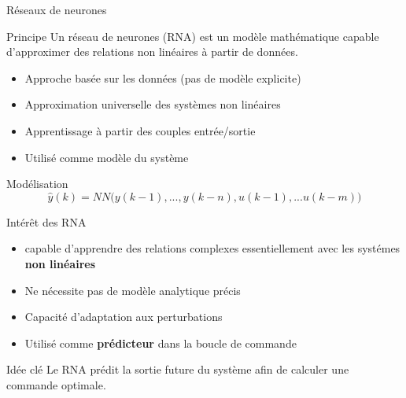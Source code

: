 \documentclass[aspectratio=169,12pt]{beamer}
\begin{document}
	\begin{frame}{\color {red}Réseaux de neurones}
		
		\begin{alertblock}{Principe}
			Un réseau de neurones (RNA) est un modèle mathématique capable 
			d’approximer des relations non linéaires à partir de données.
		\end{alertblock}
		
		\vspace{4pt}
		
		\begin{itemize}
			\item Approche basée sur les données (pas de modèle explicite)
			\item Approximation universelle des systèmes non linéaires
			\item Apprentissage à partir des couples entrée/sortie
			\item Utilisé comme modèle du système
		\end{itemize}
		
		\vspace{6pt}
		
		\begin{block}{Modélisation}
			\[
			\hat y(k) = NN\big(y(k-1),...,y(k-n),u(k-1),...u(k-m)\big)
			\]
		\end{block}
		
	\end{frame}
	\begin{frame}{\color {red}Intérêt des RNA}
		
		\begin{itemize}
			
			\item capable d'apprendre des relations complexes essentiellement avec les systémes \textbf{non linéaires}
			
			\item Ne nécessite pas de modèle analytique précis
			
			\item Capacité d’adaptation aux perturbations
			
			\item Utilisé comme \textbf{prédicteur} dans la boucle de commande
			
		\end{itemize}
		
		\vspace{6pt}
		
		\begin{alertblock}{Idée clé}
			Le RNA prédit la sortie future du système afin de calculer 
			une commande optimale.
		\end{alertblock}
		
	\end{frame}
\end{document}
